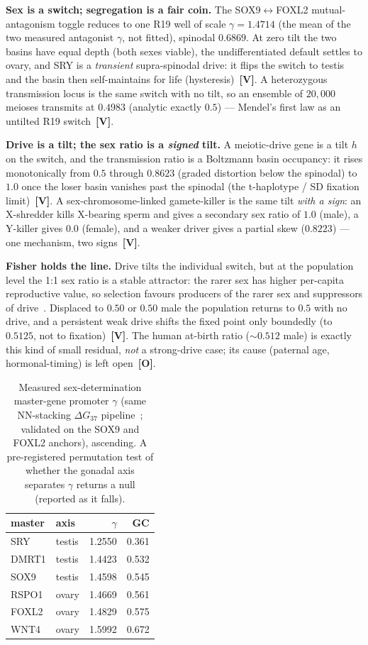 \documentclass[11pt]{article}
\newcommand{\gradeV}{\textcolor{verified}{\textbf{[V]}}}
\newcommand{\gradeO}{\textcolor{open}{\textbf{[O]}}}
\begin{document}
\textbf{Sex is a switch; segregation is a fair coin.} The SOX9$\leftrightarrow$FOXL2 mutual-antagonism toggle
reduces to one R19 well of scale $\gamma = 1.4714$ (the mean of the two measured
antagonist $\gamma$, not fitted), spinodal $0.6869$. At zero tilt the two basins
have equal depth (both sexes viable), the undifferentiated default settles to ovary, and SRY is a
\emph{transient} supra-spinodal drive: it flips the switch to testis and the basin then self-maintains for life
(hysteresis)~\gradeV{}. A heterozygous transmission locus is the same switch with no tilt, so an ensemble of
$20,000$ meioses transmits at
$0.4983$ (analytic exactly
$0.5$) --- Mendel's first law as an untilted R19 switch~\gradeV{}.

\textbf{Drive is a tilt; the sex ratio is a \emph{signed} tilt.} A meiotic-drive gene is a tilt $h$ on the
switch, and the transmission ratio is a Boltzmann basin occupancy: it rises monotonically from
$0.5$ through $0.8623$
(graded distortion below the spinodal) to $1.0$ once the
loser basin vanishes past the spinodal (the t-haplotype / SD fixation limit)~\gradeV{}. A
sex-chromosome-linked gamete-killer is the same tilt \emph{with a sign}: an X-shredder kills X-bearing sperm
and gives a secondary sex ratio of $1.0$ (male), a Y-killer gives
$0.0$ (female), and a weaker driver gives a partial skew
($0.8223$) --- one mechanism, two signs~\gradeV{}.

\textbf{Fisher holds the line.} Drive tilts the individual switch, but at the population level the 1:1 sex
ratio is a stable attractor: the rarer sex has higher per-capita reproductive value, so selection favours
producers of the rarer sex and suppressors of drive~\cite{fisher}. Displaced to
$0.50$ or $0.50$ male the population returns to
$0.5$ with no drive, and a persistent weak drive shifts the fixed point only
boundedly (to $0.5125$, not to fixation)~\gradeV{}. The human at-birth
ratio ($\sim0.512$ male) is exactly this kind of small residual,
\emph{not} a strong-drive case; its cause (paternal age, hormonal-timing) is left open~\gradeO{}.

\begin{table}[H]
\centering
\small
\caption{Measured sex-determination master-gene promoter $\gamma$ (same NN-stacking $\Delta G_{37}$ pipeline~\cite{santalucia,dnablueprint}; validated on the SOX9 and FOXL2 anchors), ascending. A pre-registered permutation test of whether the gonadal axis separates $\gamma$ returns a null (reported as it falls).}
\label{tab:sexdet-gamma}
\begin{tabular}{llrr}
\toprule
master & axis & $\gamma$ & GC \\
\midrule
SRY & testis & 1.2550 & 0.361 \\
DMRT1 & testis & 1.4423 & 0.532 \\
SOX9 & testis & 1.4598 & 0.545 \\
RSPO1 & ovary & 1.4669 & 0.561 \\
FOXL2 & ovary & 1.4829 & 0.575 \\
WNT4 & ovary & 1.5992 & 0.672 \\
\bottomrule
\end{tabular}
\end{table}
\end{document}
